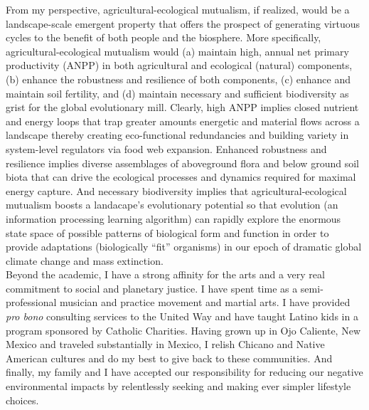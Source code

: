 \documentclass[10pt]{article}	%
\begin{document}
From my perspective, agricultural-ecological mutualism, if realized, would be a landscape-scale emergent property that offers the prospect of generating virtuous cycles to the benefit of both people and the biosphere. More specifically, agricultural-ecological mutualism would (a) maintain high, annual net primary productivity (ANPP) in both agricultural and ecological (natural) components, (b) enhance the robustness and resilience of both components, (c) enhance and maintain soil fertility, and (d) maintain necessary and sufficient biodiversity as grist for the global evolutionary mill. Clearly, high ANPP implies closed nutrient and energy loops that trap greater amounts energetic and material flows across a landscape thereby creating eco-functional redundancies and building variety in system-level regulators via food web expansion. Enhanced robustness and resilience implies diverse assemblages of aboveground flora and below ground soil biota that can drive the ecological processes and dynamics required for maximal energy capture. And necessary biodiversity implies that agricultural-ecological mutualism boosts a landacape's evolutionary potential so that evolution (an information processing learning algorithm) can rapidly explore the enormous state space of possible patterns of biological form and function in order to provide adaptations (biologically \enquote{fit} organisms) in our epoch of dramatic global climate change and mass extinction. \\


Beyond the academic, I have a strong affinity for the arts and a very real commitment to social and planetary justice. I have spent time as a semi-professional musician and practice movement and martial arts. I have provided \textit{pro bono} consulting services to the United Way and have taught Latino kids in a program sponsored by Catholic Charities. Having grown up in Ojo Caliente, New Mexico and traveled substantially in Mexico, I relish Chicano and Native American cultures and do my best to give back to these communities. And finally, my family and I have accepted our responsibility for reducing our negative environmental impacts by relentlessly seeking and making ever simpler lifestyle choices. 




%
%
\end{document}
